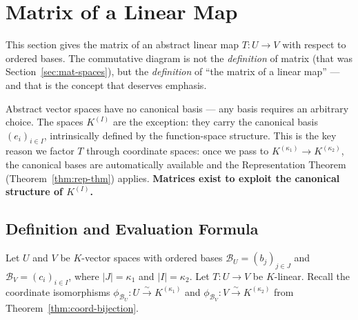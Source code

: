 
\newpage
\section{Matrix of a Linear Map}
\label{sec:matrix-of-map}

This section gives the matrix of an abstract linear map $T: U \to V$ with respect to
ordered bases. The commutative diagram is not the \emph{definition} of matrix
(that was Section~\ref{sec:mat-spaces}), but the \emph{definition} of ``the matrix of a
linear map'' --- and that is the concept that deserves emphasis.

\begin{remark}[{Why $K^{(I)}$?}]
    Abstract vector spaces have no canonical basis --- any basis requires an arbitrary choice.
    The spaces $K^{(I)}$ are the exception: they carry the canonical basis $(e_i)_{i \in I}$,
    intrinsically defined by the function-space structure. This is the key reason we factor $T$
    through coordinate spaces: once we pass to $K^{(\kappa_1)} \to K^{(\kappa_2)}$, the
    canonical bases are automatically available and the Representation Theorem
    (Theorem~\ref{thm:rep-thm}) applies.
    \textbf{Matrices exist to exploit the canonical structure of $K^{(I)}$.}
\end{remark}

\subsection{Definition and Evaluation Formula}

Let $U$ and $V$ be $K$-vector spaces with ordered bases $\mathcal{B}_U = (b_j)_{j \in J}$ and
$\mathcal{B}_V = (c_i)_{i \in I}$, where $|J| = \kappa_1$ and $|I| = \kappa_2$.
Let $T: U \to V$ be $K$-linear. Recall the coordinate isomorphisms
$\phi_{\mathcal{B}_U}: U \xrightarrow{\sim} K^{(\kappa_1)}$ and
$\phi_{\mathcal{B}_V}: V \xrightarrow{\sim} K^{(\kappa_2)}$ from Theorem~\ref{thm:coord-bijection}.

